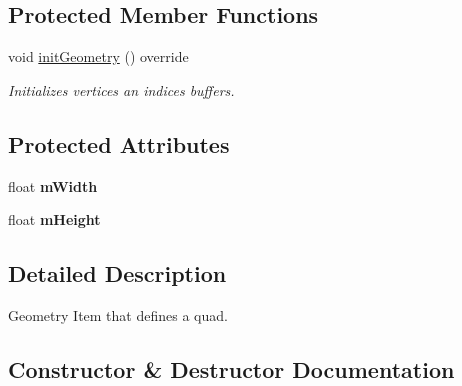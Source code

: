 \subsection*{Protected Member Functions}
\begin{DoxyCompactItemize}
\item 
\mbox{\label{class_geometry_engine_1_1_geometry_world_item_1_1_geometry_item_1_1_quad_a37eac6009469bf3c092c84af29417de5}} 
void \mbox{\hyperlink{class_geometry_engine_1_1_geometry_world_item_1_1_geometry_item_1_1_quad_a37eac6009469bf3c092c84af29417de5}{init\+Geometry}} () override
\begin{DoxyCompactList}\small\item\em Initializes vertices an indices buffers. \end{DoxyCompactList}\end{DoxyCompactItemize}
\subsection*{Protected Attributes}
\begin{DoxyCompactItemize}
\item 
\mbox{\label{class_geometry_engine_1_1_geometry_world_item_1_1_geometry_item_1_1_quad_a020b18b014639055e892ca0cbdf13ae8}} 
float {\bfseries m\+Width}
\item 
\mbox{\label{class_geometry_engine_1_1_geometry_world_item_1_1_geometry_item_1_1_quad_ae86aa1e6c6405a8d02c6d058b9c92bea}} 
float {\bfseries m\+Height}
\end{DoxyCompactItemize}


\subsection{Detailed Description}
Geometry Item that defines a quad. 

\subsection{Constructor \& Destructor Documentation}
\mbox{\label{class_geometry_engine_1_1_geometry_world_item_1_1_geometry_item_1_1_quad_ab311d3ec0cd86c53fcdf019fde0f5d69}} 
